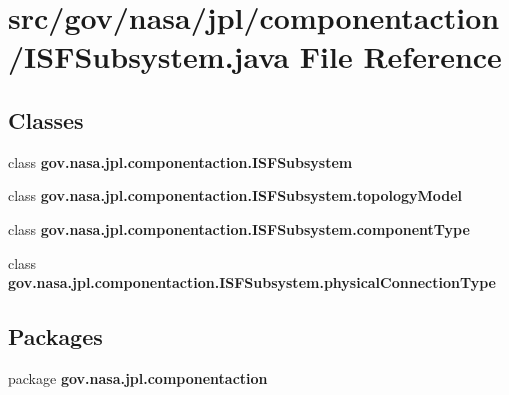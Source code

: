 \section{src/gov/nasa/jpl/componentaction/\+I\+S\+F\+Subsystem.java File Reference}
\label{_i_s_f_subsystem_8java}
\subsection*{Classes}
\begin{DoxyCompactItemize}
\item 
class {\bf gov.\+nasa.\+jpl.\+componentaction.\+I\+S\+F\+Subsystem}
\item 
class {\bf gov.\+nasa.\+jpl.\+componentaction.\+I\+S\+F\+Subsystem.\+topology\+Model}
\item 
class {\bf gov.\+nasa.\+jpl.\+componentaction.\+I\+S\+F\+Subsystem.\+component\+Type}
\item 
class {\bf gov.\+nasa.\+jpl.\+componentaction.\+I\+S\+F\+Subsystem.\+physical\+Connection\+Type}
\end{DoxyCompactItemize}
\subsection*{Packages}
\begin{DoxyCompactItemize}
\item 
package {\bf gov.\+nasa.\+jpl.\+componentaction}
\end{DoxyCompactItemize}
